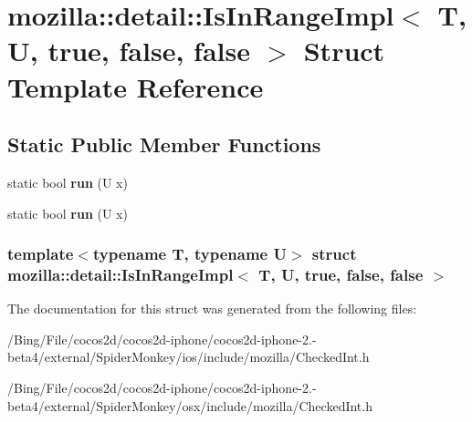 \hypertarget{structmozilla_1_1detail_1_1_is_in_range_impl_3_01_t_00_01_u_00_01true_00_01false_00_01false_01_4}{\section{mozilla\-:\-:detail\-:\-:Is\-In\-Range\-Impl$<$ T, U, true, false, false $>$ Struct Template Reference}
\label{structmozilla_1_1detail_1_1_is_in_range_impl_3_01_t_00_01_u_00_01true_00_01false_00_01false_01_4}
}
\subsection*{Static Public Member Functions}
\begin{DoxyCompactItemize}
\item 
\hypertarget{structmozilla_1_1detail_1_1_is_in_range_impl_3_01_t_00_01_u_00_01true_00_01false_00_01false_01_4_aca343a84cb004c4c927a6e9d9caa9719}{static bool {\bfseries run} (U x)}\label{structmozilla_1_1detail_1_1_is_in_range_impl_3_01_t_00_01_u_00_01true_00_01false_00_01false_01_4_aca343a84cb004c4c927a6e9d9caa9719}

\item 
\hypertarget{structmozilla_1_1detail_1_1_is_in_range_impl_3_01_t_00_01_u_00_01true_00_01false_00_01false_01_4_aca343a84cb004c4c927a6e9d9caa9719}{static bool {\bfseries run} (U x)}\label{structmozilla_1_1detail_1_1_is_in_range_impl_3_01_t_00_01_u_00_01true_00_01false_00_01false_01_4_aca343a84cb004c4c927a6e9d9caa9719}

\end{DoxyCompactItemize}
\subsubsection*{template$<$typename T, typename U$>$ struct mozilla\-::detail\-::\-Is\-In\-Range\-Impl$<$ T, U, true, false, false $>$}



The documentation for this struct was generated from the following files\-:\begin{DoxyCompactItemize}
\item 
/\-Bing/\-File/cocos2d/cocos2d-\/iphone/cocos2d-\/iphone-\/2.-\/beta4/external/\-Spider\-Monkey/ios/include/mozilla/Checked\-Int.\-h\item 
/\-Bing/\-File/cocos2d/cocos2d-\/iphone/cocos2d-\/iphone-\/2.-\/beta4/external/\-Spider\-Monkey/osx/include/mozilla/Checked\-Int.\-h\end{DoxyCompactItemize}

